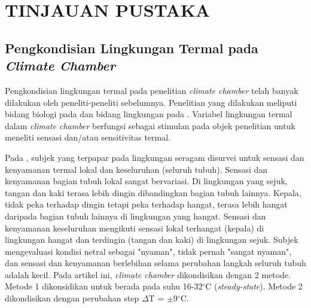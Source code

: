 \chapter{TINJAUAN PUSTAKA}
\label{pustaka}

\section{Pengkondisian Lingkungan Termal pada \textit{Climate Chamber}}

Pengkondisian lingkungan termal pada penelitian \textit{climate chamber} telah banyak dilakukan oleh peneliti-peneliti sebelumnya. Penelitian yang dilakukan meliputi bidang biologi pada \cite{paper21Arens, paper21JYLee} dan bidang lingkungan pada \cite{paper21Veronica}. Variabel lingkungan termal dalam \textit{climate chamber} berfungsi sebagai stimulan pada objek penelitian untuk meneliti sensasi dan/atau sensitivitas termal.

Pada \cite{paper21Arens}, subjek yang terpapar pada lingkungan seragam disurvei untuk sensasi dan kenyamanan termal lokal dan keseluruhan (seluruh tubuh). Sensasi dan kenyamanan bagian tubuh lokal sangat bervariasi. Di lingkungan yang sejuk, tangan dan kaki terasa lebih dingin dibandingkan bagian tubuh lainnya. Kepala, tidak peka terhadap dingin tetapi peka terhadap hangat, terasa lebih hangat daripada bagian tubuh lainnya di lingkungan yang hangat. Sensasi dan kenyamanan keseluruhan mengikuti sensasi lokal terhangat (kepala) di lingkungan hangat dan terdingin (tangan dan kaki) di lingkungan sejuk. Subjek mengevaluasi kondisi netral sebagai "nyaman", tidak pernah "sangat nyaman", dan sensasi dan kenyamanan berlebihan selama perubahan langkah seluruh tubuh adalah kecil. Pada artikel ini, \textit{climate chamber} dikondisikan dengan 2 metode. Metode 1 dikonsidikan untuk berada pada suhu 16-32$^\circ$C (\textit{steady-state}). Metode 2 dikondisikan dengan perubahan step $\Delta$T = $\pm$9$^\circ$C.

